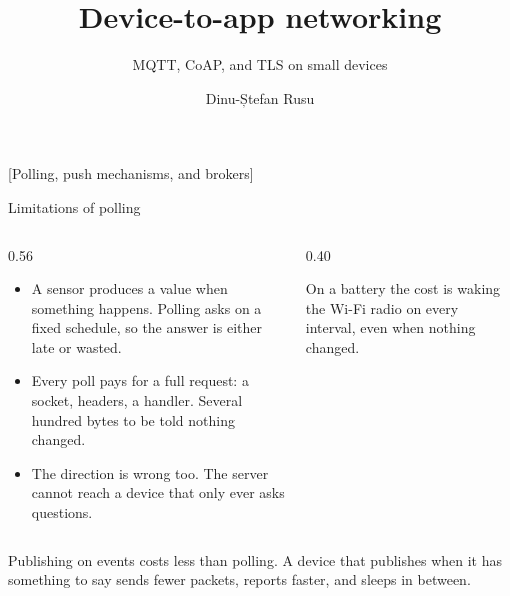\documentclass[10pt,aspectratio=169,t]{beamer}
\title{Device-to-app networking}
\subtitle{MQTT, CoAP, and TLS on small devices}
\author{Dinu-Ștefan Rusu}
\begin{document}
\titleframe


[Polling, push mechanisms, and brokers]

\begin{frame}[embedded,eyebrow=Pushing]{Limitations of polling}
  \vskip 2mm
  \begin{columns}[T]
    \begin{column}{0.56\textwidth}
      \begin{itemize}
        \item A sensor produces a value when something happens. Polling asks on a fixed schedule, so the answer is either late or wasted.
        \item Every poll pays for a full request: a socket, headers, a handler. Several hundred bytes to be told nothing changed.
        \item The direction is wrong too. The server cannot reach a device that only ever asks questions.
      \end{itemize}
    \end{column}
    \begin{column}{0.40\textwidth}
      \begin{hint}
        On a battery the cost is waking the Wi-Fi radio on every interval, even when nothing changed.
      \end{hint}
    \end{column}
  \end{columns}
  \begin{takeaway}{Publishing on events costs less than polling.}
    A device that publishes when it has something to say sends fewer packets, reports faster, and sleeps in between.
  \end{takeaway}
\end{frame}
\end{document}
